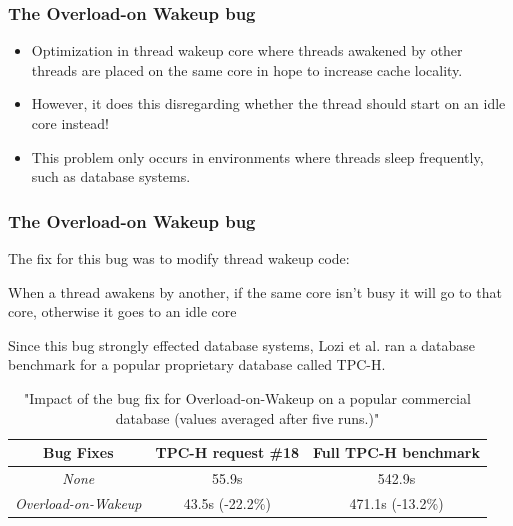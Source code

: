 \documentclass{beamer}
\newcommand{\linespace}{\vskip 0.25cm}
\begin{document}
\begin{frame}
\frametitle{The Overload-on Wakeup bug}
\begin{itemize}
\item Optimization in thread wakeup core where threads awakened by other threads are placed on the same core in hope to increase cache locality.

\linespace

\item However, it does this disregarding whether the thread should start on an idle core instead!	
\end{itemize}

\linespace

\begin{itemize}
\item This problem only occurs in environments where threads sleep frequently, such as database systems.
\end{itemize}

\end{frame}


\begin{frame}
\frametitle{The Overload-on Wakeup bug}
The fix for this bug was to modify thread wakeup code:
\linespace

When a thread awakens by another, if the same core isn't busy it will go to that core, otherwise it goes to an idle core

\linespace

Since this bug strongly effected database systems, Lozi et al. ran a database benchmark for a popular proprietary database called TPC-H.

\begin{table}
	\centering
	\begin{tabular}{| c | c | c |}
		\hline			
	  	Bug Fixes & TPC-H request \#18 & Full TPC-H benchmark \\ \hline
		\emph{None} & 55.9s & 542.9s \\ \hline
		\emph{Overload-on-Wakeup} & 43.5s (-22.2\%) & 471.1s (-13.2\%) \\
		\hline
	\end{tabular}
	\caption{"Impact of the bug fix for Overload-on-Wakeup on a popular commercial database (values averaged after five runs.)"}
\end{table}

\end{frame}
\end{document}
